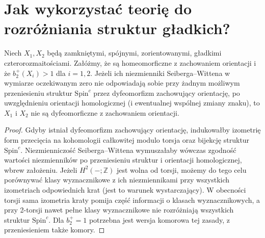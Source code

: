 \section{Jak wykorzystać teorię do rozróżniania struktur gładkich?}
\label{sec:tg-sw-exotic}

\begin{stwierdzenie}
Niech $X_1,X_2$ będą zamkniętymi, spójnymi,
zorientowanymi, gładkimi czterorozmaitościami.
Załóżmy, że są homeomorficzne z zachowaniem orientacji
i że $b_2^+(X_i)>1$ dla $i=1,2$.
Jeżeli ich niezmienniki Seiberga--Wittena
w wymiarze oczekiwanym zero nie odpowiadają sobie
przy żadnym możliwym przeniesieniu struktur
$\mathrm{Spin}^c$ przez dyfeomorfizm zachowujący
orientację, po uwzględnieniu orientacji homologicznej
(i ewentualnej wspólnej zmiany znaku), to $X_1$
i $X_2$ nie są dyfeomorficzne z zachowaniem orientacji.
\end{stwierdzenie}

\begin{proof}
Gdyby istniał dyfeomorfizm zachowujący orientację,
indukowałby izometrię form przecięcia
na kohomologii całkowitej modulo torsja oraz
bijekcję struktur $\mathrm{Spin}^c$.
Niezmienniczość Seiberga--Wittena wymuszałaby
wówczas zgodność wartości niezmienników
po przeniesieniu struktur i orientacji homologicznej,
wbrew założeniu.
Jeżeli $H^2(-;\mathbb Z)$ jest wolna od torsji,
możemy do tego celu porównywać klasy wyznacznikowe
z ich niezmiennikami przy wszystkich izometriach
odpowiednich krat (jest to warunek wystarczający).
W obecności torsji sama izometria kraty
pomija część informacji o klasach wyznacznikowych,
a przy 2-torsji nawet pełne klasy wyznacznikowe
nie rozróżniają wszystkich struktur $\mathrm{Spin}^c$.
Dla $b_2^+=1$ potrzebna jest wersja komorowa
tej zasady, z przeniesieniem także komory.
\end{proof}

\begin{center}
\end{center}

